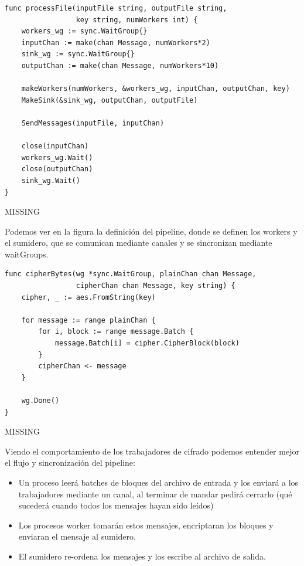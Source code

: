 \documentclass[11pt]{article}
\begin{document}
\begin{listing}[h]
\begin{verbatim}
func processFile(inputFile string, outputFile string,
                 key string, numWorkers int) {
    workers_wg := sync.WaitGroup{}
    inputChan := make(chan Message, numWorkers*2)
    sink_wg := sync.WaitGroup{}
    outputChan := make(chan Message, numWorkers*10)

    makeWorkers(numWorkers, &workers_wg, inputChan, outputChan, key)
    MakeSink(&sink_wg, outputChan, outputFile)

    SendMessages(inputFile, inputChan)

    close(inputChan)
    workers_wg.Wait()
    close(outputChan)
    sink_wg.Wait()
}
\end{verbatim}
\caption{MISSING} %
\end{listing}

Podemos ver en la figura la definición del pipeline, donde se definen los workers y el sumidero, que se comunican mediante canales y se sincronizan mediante waitGroups. %

\begin{listing}[h]
\begin{verbatim}
func cipherBytes(wg *sync.WaitGroup, plainChan chan Message,
                 cipherChan chan Message, key string) {	
    cipher, _ := aes.FromString(key)

    for message := range plainChan {
        for i, block := range message.Batch {
            message.Batch[i] = cipher.CipherBlock(block)
        }
        cipherChan <- message
    }

    wg.Done()
}
\end{verbatim}
\caption{MISSING} %
\end{listing}

Viendo el comportamiento de los trabajadores de cifrado podemos entender mejor el flujo y sincronización del pipeline:

\begin{itemize}
    \item Un proceso leerá batches de bloques del archivo de entrada y los enviará a los trabajadores mediante un canal, al terminar de mandar pedirá cerrarlo (qué sucederá cuando todos los mensajes hayan sido leídos)
    \item Los procesos worker tomarán estos mensajes, encriptaran los bloques y enviaran el mensaje al sumidero.
    \item El sumidero re-ordena los mensajes y los escribe al archivo de salida.
\end{itemize}
\end{document}
